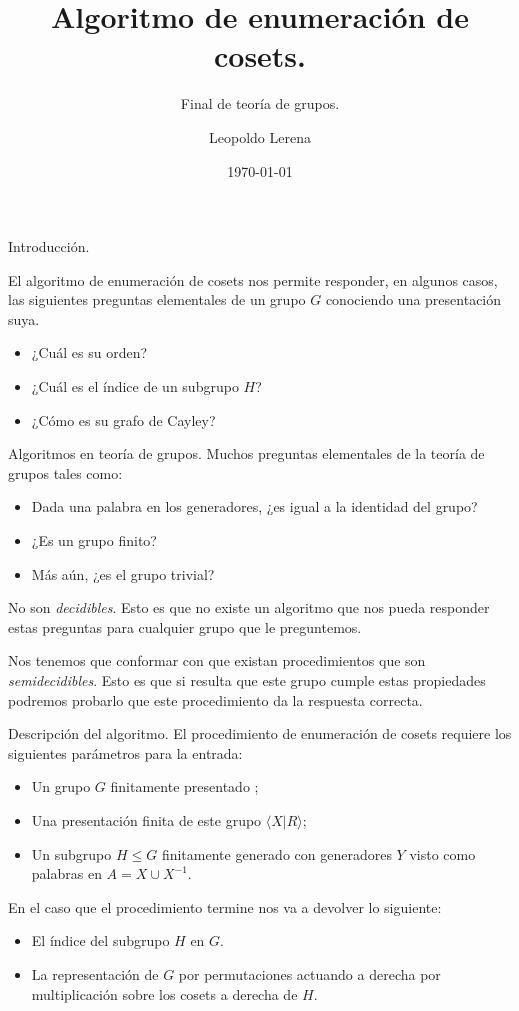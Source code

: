 \documentclass[aspectratio=169, 9pt]{beamer}
\title{Algoritmo de enumeración de cosets.}
\subtitle{Final de teoría de grupos.}
\date{\today}
\author{Leopoldo Lerena}
\institute{Universidad de Buenos Aires}
\newcommand{\fg}{finitamente generado }
\newcommand{\fp}{finitamente presentado }
\begin{document}
\maketitle

\begin{frame}[fragile]{Introducción.}

El algoritmo de enumeración de cosets nos permite responder, en algunos casos, las siguientes preguntas elementales de un grupo $G$ conociendo una presentación suya.

\begin{itemize}
	\item ¿Cuál es su orden?
	\pause
	\item ¿Cuál es 	el índice de un subgrupo $H$?
	\pause
	\item ¿Cómo es su grafo de Cayley?
\end{itemize}
\end{frame}

\begin{frame}[fragile]{Algoritmos en teoría de grupos.}
	Muchos preguntas elementales de la teoría de grupos tales como:
	\begin{itemize}
		\item Dada una palabra en los generadores, ¿es igual a la identidad del grupo?
		\pause
		\item ¿Es un grupo finito?
		\pause
		\item Más aún, ¿es el grupo trivial?
	\end{itemize}
	\pause
	No son \textit{decidibles}. 
	Esto es que no existe un algoritmo que nos pueda responder estas preguntas para cualquier grupo que le preguntemos.
	\medskip
	
	\pause
	
	
	Nos tenemos que conformar con que existan procedimientos que son \textit{semidecidibles}. 
	Esto es que si resulta que este grupo cumple estas propiedades podremos probarlo
	que este procedimiento da la respuesta correcta.
\end{frame}

\begin{frame}[fragile]{Descripción del algoritmo.}
	El procedimiento de enumeración de cosets requiere los siguientes parámetros para la entrada:
	\begin{itemize}
		\item Un grupo $G$ \fp;
		\pause
		\item Una presentación finita de este grupo $\langle X | R \rangle$;
		\pause
		\item Un subgrupo $H \le G$  \fg con generadores $Y$ visto como palabras en $A = X \cup X^{-1}$.
	\end{itemize}
	\pause
	\medskip
	
	En el caso que el procedimiento termine nos va a devolver lo siguiente:
	\begin{itemize}
		\item El índice del subgrupo $H$ en $G$.
		\pause
		\item La representación de $G$ por permutaciones actuando a derecha por multiplicación sobre los cosets a derecha de $H$.
		\pause 
	\end{itemize}  
\end{frame}
\end{document}

